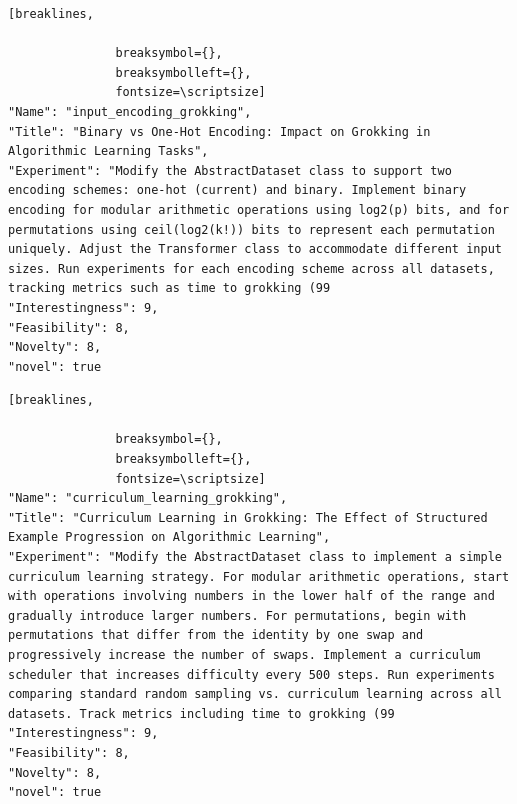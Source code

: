 \begin{tcolorbox}[
  breakable,
  colback  = blue!5!white,
  colframe = blue!75!black,
  title    = {Idea 7/50 - \texttt{input\_encoding\_grokking}},
  fontupper=\scriptsize\ttfamily,
]
\begin{Verbatim}[breaklines,

               breaksymbol={},
               breaksymbolleft={},
               fontsize=\scriptsize]
"Name": "input_encoding_grokking",
"Title": "Binary vs One-Hot Encoding: Impact on Grokking in Algorithmic Learning Tasks",
"Experiment": "Modify the AbstractDataset class to support two encoding schemes: one-hot (current) and binary. Implement binary encoding for modular arithmetic operations using log2(p) bits, and for permutations using ceil(log2(k!)) bits to represent each permutation uniquely. Adjust the Transformer class to accommodate different input sizes. Run experiments for each encoding scheme across all datasets, tracking metrics such as time to grokking (99
"Interestingness": 9,
"Feasibility": 8,
"Novelty": 8,
"novel": true
\end{Verbatim}
\end{tcolorbox}

\begin{tcolorbox}[
  breakable,
  colback  = blue!5!white,
  colframe = blue!75!black,
  title    = {Idea 8/50 - \texttt{curriculum\_learning\_grokking}},
  fontupper=\scriptsize\ttfamily,
]
\begin{Verbatim}[breaklines,

               breaksymbol={},
               breaksymbolleft={},
               fontsize=\scriptsize]
"Name": "curriculum_learning_grokking",
"Title": "Curriculum Learning in Grokking: The Effect of Structured Example Progression on Algorithmic Learning",
"Experiment": "Modify the AbstractDataset class to implement a simple curriculum learning strategy. For modular arithmetic operations, start with operations involving numbers in the lower half of the range and gradually introduce larger numbers. For permutations, begin with permutations that differ from the identity by one swap and progressively increase the number of swaps. Implement a curriculum scheduler that increases difficulty every 500 steps. Run experiments comparing standard random sampling vs. curriculum learning across all datasets. Track metrics including time to grokking (99
"Interestingness": 9,
"Feasibility": 8,
"Novelty": 8,
"novel": true
\end{Verbatim}
\end{tcolorbox}

